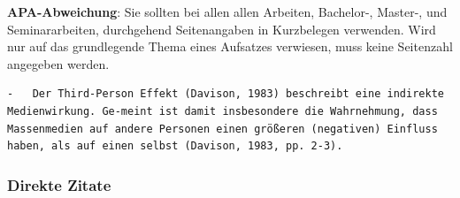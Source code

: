 \documentclass[
  letterpaper,
  DIV=11]{scrreprt}
\begin{document}
\begin{tcolorbox}[enhanced jigsaw, rightrule=.15mm, colframe=quarto-callout-important-color-frame, opacityback=0, toptitle=1mm, colbacktitle=quarto-callout-important-color!10!white, breakable, titlerule=0mm, colback=white, arc=.35mm, toprule=.15mm, leftrule=.75mm, bottomtitle=1mm, coltitle=black, left=2mm, title=\textcolor{quarto-callout-important-color}{\faExclamation}\hspace{0.5em}{Wichtig}, bottomrule=.15mm, opacitybacktitle=0.6]

\textbf{APA-Abweichung}: Sie sollten bei allen allen Arbeiten,
Bachelor-, Master-, und Seminararbeiten, durchgehend Seitenangaben in
Kurzbelegen verwenden. Wird nur auf das grundlegende Thema eines
Aufsatzes verwiesen, muss keine Seitenzahl angegeben werden.

\end{tcolorbox}

\begin{verbatim}
-   Der Third-Person Effekt (Davison, 1983) beschreibt eine indirekte Medienwirkung. Ge-meint ist damit insbesondere die Wahrnehmung, dass Massenmedien auf andere Personen einen größeren (negativen) Einfluss haben, als auf einen selbst (Davison, 1983, pp. 2-3).
\end{verbatim}

\subsubsection{Direkte Zitate}\label{direkte-zitate}
\end{document}
